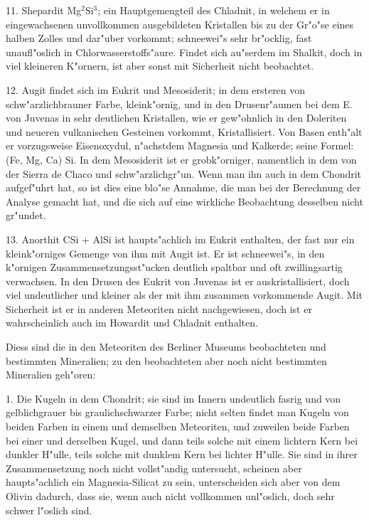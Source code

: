 \documentclass[a4paper, 11pt, oneside, german]{article}
\begin{document}
11. Shepardit Mg$^{2}$Si$^{3}$; ein Hauptgemengteil des Chladnit, in welchem er in eingewachsenen unvollkommen ausgebildeten Kristallen bis zu der Gr"o"se eines halben Zolles und dar"uber vorkommt; schneewei"s sehr br"ocklig, fast unaufl"oslich in Chlorwasserstoffs"aure. Findet sich au"serdem im Shalkit, doch in viel kleineren K"ornern, ist aber sonst mit Sicherheit nicht beobachtet.

12. Augit findet sich im Eukrit und Mesosiderit; in dem ersteren von schw"arzlichbrauner Farbe, kleink"ornig, und in den Drusenr"aumen bei dem E. von Juvenas in sehr deutlichen Kristallen, wie er gew"ohnlich in den Doleriten und neueren vulkanischen Gesteinen vorkommt, Kristallisiert. Von Basen enth"alt er vorzugsweise Eisenoxydul, n"achstdem Magnesia und Kalkerde; seine Formel: (Fe, Mg, Ca) Si. In dem Mesosiderit ist er grobk"orniger, namentlich in dem von der Sierra de Chaco und schw"arzlichgr"un. Wenn man ihn auch in dem Chondrit aufgef"uhrt hat, so ist dies eine blo"se Annahme, die man bei der Berechnung der Analyse gemacht hat, und die sich auf eine wirkliche Beobachtung desselben nicht gr"undet.

13. Anorthit CSi + AlSi ist haupts"achlich im Eukrit enthalten, der fast nur ein kleink"orniges Gemenge von ihm mit Augit ist. Er ist schneewei"s, in den k"ornigen Zusammensetzungsst"ucken deutlich spaltbar und oft zwillingsartig verwachsen. In den Drusen des Eukrit von Juvenas ist er auskristallisiert, doch viel undeutlicher und kleiner als der mit ihm zusammen vorkommende Augit. Mit Sicherheit ist er in anderen Meteoriten nicht nachgewiesen, doch ist er wahrscheinlich auch im Howardit und Chladnit enthalten.

Diess sind die in den Meteoriten des Berliner Museums beobachteten und bestimmten Mineralien; zu den beobachteten aber noch nicht bestimmten Mineralien geh"oren:

1. Die Kugeln in dem Chondrit; sie sind im Innern undeutlich fasrig und von gelblichgrauer bis graulichschwarzer Farbe; nicht selten findet man Kugeln von beiden Farben in einem und demselben Meteoriten, und zuweilen beide Farben bei einer und derselben Kugel, und dann teils solche mit einem lichtern Kern bei dunkler H"ulle, teils solche mit dunklem Kern bei lichter H"ulle. Sie sind in ihrer Zusammensetzung noch nicht vollst"andig untersucht, scheinen aber haupts"achlich ein Magnesia-Silicat zu sein, unterscheiden sich aber von dem Olivin dadurch, dass sie, wenn auch nicht vollkommen unl"oslich, doch sehr schwer l"oslich sind.
\end{document}

